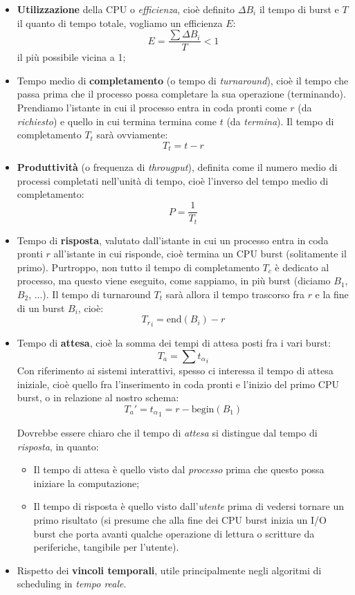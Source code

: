 \documentclass[a4paper,11pt]{article}
\begin{document}
\begin{itemize}
	\item \textbf{Utilizzazione} della CPU o \textit{efficienza}, cioè definito $\Delta B_i$ il tempo di burst e $T$ il quanto di tempo totale, vogliamo un efficienza $E$:
		$$
			E = \frac{\sum \Delta B_i}{T} < 1
		$$
		il più possibile vicina a 1;
	\item Tempo medio di \textbf{completamento} (o tempo di \textit{turnaround}), cioè il tempo che passa prima che il processo possa completare la sua operazione (terminando). Prendiamo l'istante in cui il processo entra in coda pronti come $r$ (da \textit{richiesto}) e quello in cui termina termina come $t$ (da \textit{termina}). Il tempo di completamento $T_t$ sarà ovviamente:
		$$
			T_t = t - r
		$$
	\item \textbf{Produttività} (o frequenza di \textit{througput}), definita come il numero medio di processi completati nell'unità di tempo, cioè l'inverso del tempo medio di completamento:
		$$
			P = \frac{1}{T_t}
		$$
	\item Tempo di \textbf{risposta}, valutato dall'istante in cui un processo entra in coda pronti $r$ all'istante in cui risponde, cioè termina un CPU burst (solitamente il primo). Purtroppo, non tutto il tempo di completamento $T_c$ è dedicato al processo, ma questo viene eseguito, come sappiamo, in più burst (diciamo $B_1$, $B_2$, ...). Il tempo di turnaround $T_t$ sarà allora il tempo trascorso fra $r$ e la fine di un burst $B_i$, cioè:
		$$
			{T_r}_i = \text{end}(B_i) - r
		$$
	\item Tempo di \textbf{attesa}, cioè la somma dei tempi di attesa posti fra i vari burst:
		$$
		T_a = \sum {t_\alpha}_i
		$$
		Con riferimento ai sistemi interattivi, spesso ci interessa il tempo di attesa iniziale, cioè quello fra l'inserimento in coda pronti e l'inizio del primo CPU burst, o in relazione al nostro schema:
		$$
		T_a' = {t_\alpha}_1 = r - \text{begin}(B_1)
		$$

		Dovrebbe essere chiaro che il tempo di \textit{attesa} si distingue dal tempo di \textit{risposta}, in quanto:
		\begin{itemize}
			\item Il tempo di attesa è quello visto dal \textit{processo} prima che questo possa iniziare la computazione;
			\item Il tempo di risposta è quello visto dall'\textit{utente} prima di vedersi tornare un primo risultato (si presume che alla fine dei CPU burst inizia un I/O burst che porta avanti qualche operazione di lettura o scritture da periferiche, tangibile per l'utente).
		\end{itemize}
	\item Rispetto dei \textbf{vincoli temporali}, utile principalmente negli algoritmi di scheduling in \textit{tempo reale}.
\end{itemize}
\end{document}
